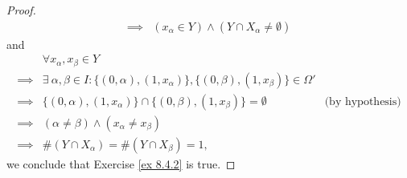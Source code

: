 \begin{proof}
\begin{align*}
        \implies & (x_\alpha \in Y) \land (Y \cap X_{\alpha} \neq \emptyset)
    \end{align*}
    and
    \begin{align*}
                 & \forall x_{\alpha}, x_{\beta} \in Y                                                                                                  \\
        \implies & \exists\ \alpha, \beta \in I : \{(0, \alpha), (1, x_{\alpha})\}, \{(0, \beta), (1, x_{\beta})\} \in \Omega'                          \\
        \implies & \{(0, \alpha), (1, x_{\alpha})\} \cap \{(0, \beta), (1, x_{\beta})\} = \emptyset                            & \text{(by hypothesis)} \\
        \implies & (\alpha \neq \beta) \land (x_{\alpha} \neq x_{\beta})                                                                                \\
        \implies & \#(Y \cap X_{\alpha}) = \#(Y \cap X_{\beta}) = 1,
    \end{align*}
    we conclude that Exercise \ref{ex 8.4.2} is true.
\end{proof}